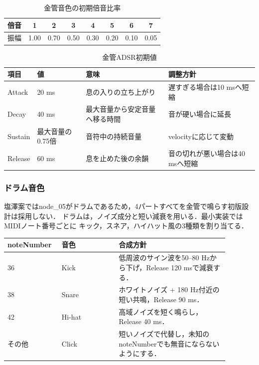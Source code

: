 \documentclass[a4paper,11pt]{jsarticle}
\begin{document}
\begin{table}[htbp]
\centering
\caption{金管音色の初期倍音比率}
\begin{tabular}{cccccccc}
\hline
倍音 & 1 & 2 & 3 & 4 & 5 & 6 & 7 \\
\hline
振幅 & 1.00 & 0.70 & 0.50 & 0.30 & 0.20 & 0.10 & 0.05 \\
\hline
\end{tabular}
\end{table}

\begin{table}[htbp]
\centering
\caption{金管ADSR初期値}
\begin{tabular}{llll}
\hline
項目 & 値 & 意味 & 調整方針 \\
\hline
Attack & 20 ms & 息の入りの立ち上がり & 遅すぎる場合は10 msへ短縮 \\
\hline
Decay & 40 ms & 最大音量から安定音量へ移る時間 & 音が硬い場合に延長 \\
\hline
Sustain & 最大音量の0.75倍 & 音符中の持続音量 & velocityに応じて変動 \\
\hline
Release & 60 ms & 息を止めた後の余韻 & 音の切れが悪い場合は40 msへ短縮 \\
\hline
\end{tabular}
\end{table}

\subsubsection{ドラム音色}

塩澤案ではnode\_05がドラムであるため，4パートすべてを金管で鳴らす初版設計は採用しない．
ドラムは，ノイズ成分と短い減衰を用いる．最小実装ではMIDIノート番号ごとに
キック，スネア，ハイハット風の3種類を割り当てる．

\begin{longtable}{p{0.18\linewidth}p{0.24\linewidth}p{0.46\linewidth}}
\hline
noteNumber & 音色 & 合成方針 \\
\hline
\endhead
36 & Kick & 低周波のサイン波を50--80 Hzから下げ，Release 120 msで減衰する． \\
\hline
38 & Snare & ホワイトノイズ + 180 Hz付近の短い共鳴，Release 90 ms． \\
\hline
42 & Hi-hat & 高域ノイズを短く鳴らし，Release 40 ms． \\
\hline
その他 & Click & 短いノイズで代替し，未知のnoteNumberでも無音にならないようにする． \\
\hline
\end{longtable}
\end{document}
